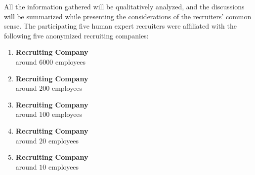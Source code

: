 \documentclass[draft,final]{thesisclass} %
\begin{document}
All the information gathered will be qualitatively analyzed, and the discussions will be summarized while presenting the considerations of the recruiters' common sense.
The participating five human expert recruiters were affiliated with the following five anonymized recruiting companies:
\begin{enumerate}
    \item \textbf{Recruiting Company}\\
    around $6000$ employees
    \item \textbf{Recruiting Company}\\
    around $200$ employees
    \item \textbf{Recruiting Company}\\
    around $100$ employees
    \item \textbf{Recruiting Company}\\
    around $20$ employees
    \item \textbf{Recruiting Company}\\
    around $10$ employees
\end{enumerate}
\end{document}

